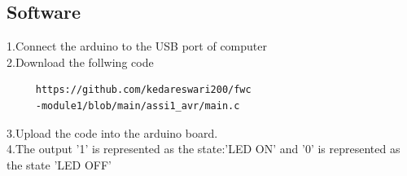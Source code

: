 \documentclass[10pt]{report}
\begin{document}
\begin{multicols}{2}
\section{Software}
  1.Connect the arduino to the USB port of computer
  \\
  2.Download the follwing code
  \begin{lstlisting}
     https://github.com/kedareswari200/fwc
     -module1/blob/main/assi1_avr/main.c
  \end{lstlisting}
  
  3.Upload the code into the arduino board.
  \\
  4.The output '1' is represented as the state:'LED ON' and '0' is represented as the state 'LED OFF'

\end{multicols}
\end{document}
